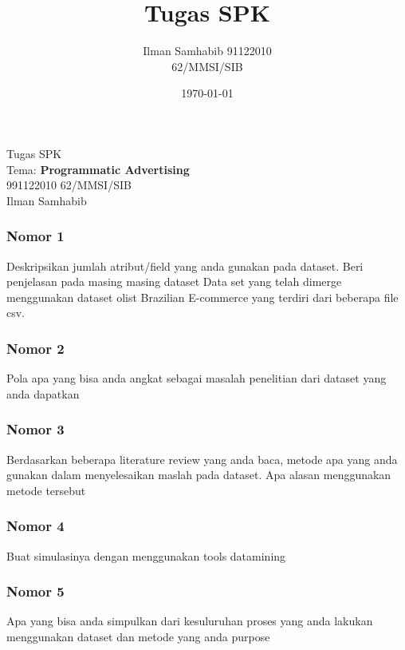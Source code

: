 \documentclass{article}
\title{Tugas SPK}
\author{Ilman Samhabib 91122010\\62/MMSI/SIB}
\date{\today}
\begin{document}
\begin{center}
    Tugas SPK
    \\ Tema: \textbf{Programmatic Advertising} 
    \\ 991122010 62/MMSI/SIB
    \\ Ilman Samhabib
\end{center}

\subsubsection*{Nomor 1}
Deskripsikan jumlah atribut/field yang anda gunakan pada dataset. Beri penjelasan pada masing masing dataset
\bigbreak
Data set yang telah dimerge menggunakan dataset olist Brazilian E-commerce \cite{olist_2018}  yang terdiri dari beberapa file csv.
\subsubsection*{Nomor 2}
Pola apa yang bisa anda angkat sebagai masalah penelitian dari dataset yang anda dapatkan
\subsubsection*{Nomor 3}
Berdasarkan beberapa literature review yang anda baca, metode apa yang anda gunakan dalam menyelesaikan maslah pada dataset. Apa alasan menggunakan metode tersebut
\subsubsection*{Nomor 4}
Buat simulasinya dengan menggunakan tools datamining 
\subsubsection*{Nomor 5}
Apa yang bisa anda simpulkan dari kesuluruhan proses yang anda lakukan menggunakan dataset dan metode yang anda purpose






\end{document}
